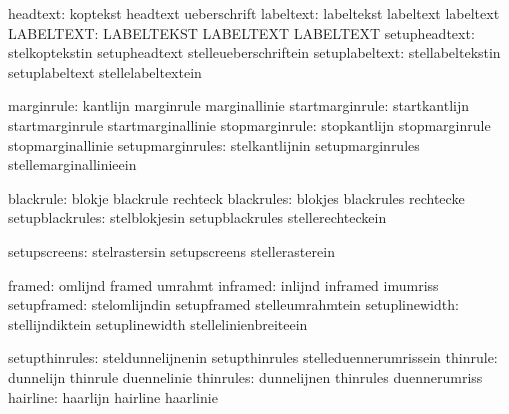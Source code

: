                      headtext:  koptekst                     headtext
                                ueberschrift
                    labeltext:  labeltekst                   labeltext
                                labeltext
                    LABELTEXT:  LABELTEKST                   LABELTEXT
                                LABELTEXT
                setupheadtext:  stelkoptekstin               setupheadtext
                                stelleueberschriftein
               setuplabeltext:  stellabeltekstin             setuplabeltext
                                stellelabeltextein

                   marginrule:  kantlijn                     marginrule
                                marginallinie
              startmarginrule:  startkantlijn                startmarginrule
                                startmarginallinie
               stopmarginrule:  stopkantlijn                 stopmarginrule
                                stopmarginallinie
             setupmarginrules:  stelkantlijnin               setupmarginrules
                                stellemarginallinieein

                    blackrule:  blokje                       blackrule
                                rechteck
                   blackrules:  blokjes                      blackrules
                                rechtecke
              setupblackrules:  stelblokjesin                setupblackrules
                                stellerechteckein

                 setupscreens:  stelrastersin                setupscreens
                                stellerasterein

                       framed:  omlijnd                      framed
                                umrahmt
                     inframed:  inlijnd                      inframed
                                imumriss
                  setupframed:  stelomlijndin                setupframed
                                stelleumrahmtein
               setuplinewidth:  stellijndiktein              setuplinewidth
                                stellelinienbreiteein

               setupthinrules:  steldunnelijnenin            setupthinrules
                                stelleduennerumrissein
                     thinrule:  dunnelijn                    thinrule
                                duennelinie
                    thinrules:  dunnelijnen                  thinrules
                                duennerumriss
                     hairline:  haarlijn                     hairline
                                haarlinie

